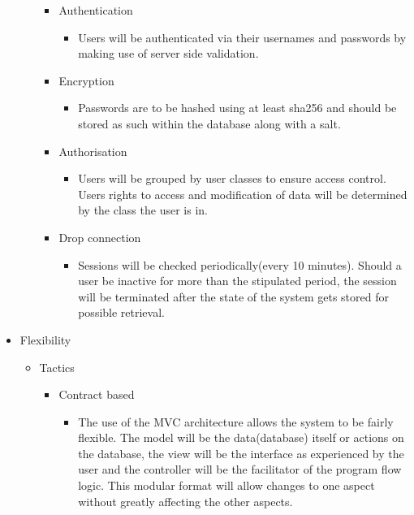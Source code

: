 \documentclass{article}
\begin{document}
\begin{itemize}
\begin{itemize}
\begin{itemize}
				\item Authentication
					
					\begin{itemize}
						\item Users will be authenticated via their usernames and passwords by making use of server side validation.
					\end{itemize}
					
				\item Encryption
				
					\begin{itemize}
						 \item Passwords are to be hashed using at least sha256 and should be stored as such within the database along with a salt.
					\end{itemize}				 		
						 
				\item Authorisation
						\begin{itemize}
							\item Users will be grouped by user classes to ensure access control. Users rights to access and modification of data will be determined by the class the user is in.
						\end{itemize}		
					
					
				\item Drop connection
					\begin{itemize}
						\item Sessions will be checked periodically(every 10 minutes). Should a user be inactive for more than the stipulated period, the session will be terminated after the state of the system gets stored for possible retrieval.
					\end{itemize}
			\end{itemize}			
			
		\end{itemize}
		\item Flexibility
		\begin{itemize}
			
			\item Tactics
			\begin{itemize}
				
				\item Contract based
					\begin{itemize}
						\item The use of the MVC architecture allows the system to be fairly flexible. The model will be the data(database) itself or actions on the database, the view will be the interface as experienced by the user and the controller will be the facilitator of the program flow logic. This modular format will allow changes to one aspect without greatly affecting the other aspects.
					\end{itemize}


\end{itemize}
\end{itemize}
\end{itemize}
\end{document}
